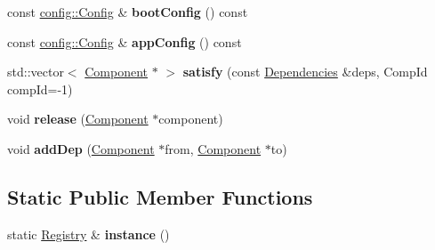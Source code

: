 \begin{DoxyCompactItemize}
\item 
\hypertarget{classtheoria_1_1core_1_1Registry_a433d5a646a5f19a5e24852eef7c21d49}{const \hyperlink{classtheoria_1_1config_1_1Config}{config\+::\+Config} \& {\bfseries boot\+Config} () const }\label{classtheoria_1_1core_1_1Registry_a433d5a646a5f19a5e24852eef7c21d49}

\item 
\hypertarget{classtheoria_1_1core_1_1Registry_afd2587440ae5133a7e7a24209eb965fc}{const \hyperlink{classtheoria_1_1config_1_1Config}{config\+::\+Config} \& {\bfseries app\+Config} () const }\label{classtheoria_1_1core_1_1Registry_afd2587440ae5133a7e7a24209eb965fc}

\item 
\hypertarget{classtheoria_1_1core_1_1Registry_aaa8dbdd7993478eea310fa111e36d40a}{std\+::vector$<$ \hyperlink{classtheoria_1_1core_1_1Component}{Component} $\ast$ $>$ {\bfseries satisfy} (const \hyperlink{classtheoria_1_1core_1_1Dependencies}{Dependencies} \&deps, Comp\+Id comp\+Id=-\/1)}\label{classtheoria_1_1core_1_1Registry_aaa8dbdd7993478eea310fa111e36d40a}

\item 
\hypertarget{classtheoria_1_1core_1_1Registry_adead32a72f8f70bac8f01645dc912720}{void {\bfseries release} (\hyperlink{classtheoria_1_1core_1_1Component}{Component} $\ast$component)}\label{classtheoria_1_1core_1_1Registry_adead32a72f8f70bac8f01645dc912720}

\item 
\hypertarget{classtheoria_1_1core_1_1Registry_ad5ada88f383f823f983810b70f80d67b}{void {\bfseries add\+Dep} (\hyperlink{classtheoria_1_1core_1_1Component}{Component} $\ast$from, \hyperlink{classtheoria_1_1core_1_1Component}{Component} $\ast$to)}\label{classtheoria_1_1core_1_1Registry_ad5ada88f383f823f983810b70f80d67b}

\end{DoxyCompactItemize}
\subsection*{Static Public Member Functions}
\begin{DoxyCompactItemize}
\item 
\hypertarget{classtheoria_1_1core_1_1Registry_ac36dbf9ae74e19b9fe30f57910e3d93a}{static \hyperlink{classtheoria_1_1core_1_1Registry}{Registry} \& {\bfseries instance} ()}\label{classtheoria_1_1core_1_1Registry_ac36dbf9ae74e19b9fe30f57910e3d93a}

\end{DoxyCompactItemize}
